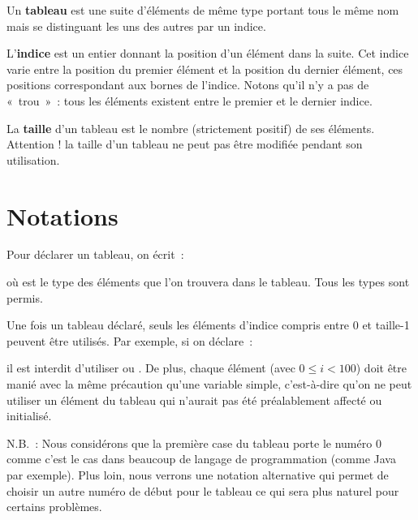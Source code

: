 		Un \textbf{tableau} est une suite d’éléments de même type 
		portant tous le même nom mais se distinguant 
		les uns des autres par un indice.
	
		L’\textbf{indice} est un entier 
		donnant la position d’un élément dans la suite. 
		Cet indice varie entre la position du premier élément 
		et la position du dernier élément, 
		ces positions correspondant aux bornes de l’indice.
		Notons qu'il n'y a pas de «~trou~»~: 
		tous les éléments existent entre le premier et le dernier indice.
	
		La \textbf{taille} d’un tableau 
		est le nombre (strictement positif) de ses éléments.
		Attention ! la taille d’un tableau ne peut pas être modifiée pendant
		son utilisation.
	
	\section{Notations}
	
		Pour déclarer un tableau, on écrit~:
	
		\begin{LDA}
		\end{LDA}
		
		où  est le type des éléments 
		que l’on trouvera dans le tableau.
		Tous les types sont permis. 
	
		Une fois un tableau déclaré, 
		seuls les éléments d’indice compris entre
		0 et taille-1 peuvent être utilisés. 
		Par exemple, si on déclare~:
	
		\begin{LDA}
		\Decl{tabEntiers}{\Array{100}{entiers}}
		\end{LDA}
		
		il est interdit d’utiliser  ou
		. 
		De plus, chaque élément
		 (avec $0 \leq i < 100$) 
		doit être manié avec la même précaution 
		qu’une variable simple, 
		c’est-à-dire qu’on ne peut utiliser un élément du tableau 
		qui n’aurait pas été préalablement affecté ou initialisé.
	
		N.B.~: Nous considérons que la première case du tableau
		porte le numéro 0 comme c'est le cas dans beaucoup de langage
		de programmation (comme Java par exemple).
		Plus loin, nous verrons une notation alternative
		qui permet de choisir un autre numéro de début pour le tableau
		ce qui sera plus naturel pour certains problèmes.
	
